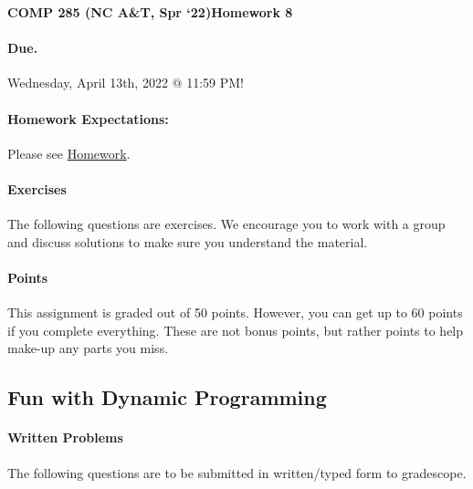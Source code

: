 \documentclass [12pt]{article}
\begin{document}
 

{\LARGE \textbf{COMP 285 (NC A\&T, Spr `22)}\hfill \textbf{Homework 8} } 
\vspace{1em} 
\begin{Instruction} 

\paragraph{Due.} Wednesday, April 13th, 2022 @ 11:59 PM!
\end{Instruction} 

\vspace{1em} 
\begin{Instruction} \paragraph{Homework Expectations:} Please see \href{https://www.comp285-fall22.ml/homework/#general-homework-information}{Homework}.
\end{Instruction}

\vspace{1em} 
\begin{Instruction} 

\paragraph{Exercises} The following questions are exercises. We encourage you to work with a group and discuss solutions to make sure you understand the material.

\paragraph{Points} This assignment is graded out of 50 points. However, you can get up to 60 points if you complete everything. These are not bonus points, but rather points to help make-up any parts you miss.

\end{Instruction} 

\begin{centering}
\section*{Fun with Dynamic Programming}
\end{centering}

\begin{Instruction}

\paragraph{Written Problems} The following questions are to be submitted in written/typed form to gradescope.

\end{Instruction}
\end{document}
